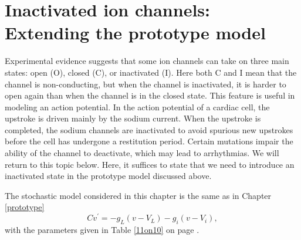 \chapter[Inactivated ion channels]{Inactivated ion channels: Extending the prototype model}
\label{inactivated}

Experimental evidence suggests that some ion channels can take on three main
states: open (O), closed (C), or inactivated (I). Here both C and I mean that
the channel is non-conducting, but when the channel is inactivated, it is harder
to open again than when the channel is in the closed state. This feature is
useful in modeling an action potential. In the action potential of a
cardiac cell, the upstroke is driven mainly by the sodium current. When the
upstroke is completed, the sodium channels are inactivated to avoid
spurious new upstrokes before the cell has undergone a restitution period. 
Certain mutations impair the ability of the channel to deactivate, which
may lead to arrhythmias. We will return to this topic below. Here,
it suffices to state that we need to introduce an inactivated state in the
prototype model discussed above.

The stochastic model considered in this chapter is the same as in Chapter \ref{prototype}
\begin{equation}
Cv^{\prime}=-g_{L}\left(  v-V_{L}\right)  -g_{i}(v-V_{i}), \label{v1b}
\end{equation}
with the parameters given in Table \ref{11on10} on page \pageref{11on10}.



